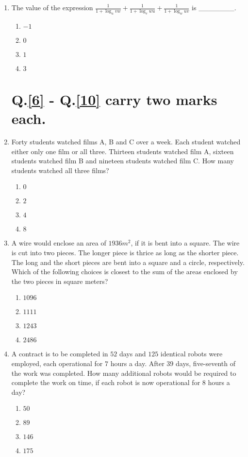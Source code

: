 \documentclass[journal]{IEEEtran}
\begin{document}
\begin{enumerate}
    \item \label{5} The value of the expression $\frac{1}{1 + \log_u vw} + \frac{1}{1 + \log_v wu} + \frac{1}{1 + \log_w uv}$ is \_\_\_\_\_\_\_.
        \begin{enumerate}
            \item $-1$
            \item $0$
            \item $1$
            \item $3$
        \end{enumerate}

\section*{Q.\ref{6} - Q.\ref{10} carry two marks each.}
    \item \label{6} Forty students watched films A, B and C over a week. Each student watched either only one film or all three. Thirteen students watched film A, sixteen students watched film B and nineteen students watched film C. How many students watched all three films?
        \begin{enumerate}
            \item $0$
            \item $2$
            \item $4$
            \item $8$
        \end{enumerate}

    \item A wire would enclose an area of $1936 m^2$, if it is bent into a square. The wire is cut into two pieces. The longer piece is thrice as long as the shorter piece. The long and the short pieces are bent into a square and a circle, respectively. Which of the following choices is closest to the sum of the areas enclosed by the two pieces in square meters?
        \begin{enumerate}
            \item $1096$
            \item $1111$
            \item $1243$
            \item $2486$
        \end{enumerate}
    
    \item A contract is to be completed in $52$ days and $125$ identical robots were employed, each operational for $7$ hours a day. After $39$ days, five-seventh of the work was completed. How many additional robots would be required to complete the work on time, if each robot is now operational for 8 hours a day?
        \begin{enumerate}
            \item $50$
            \item $89$
            \item $146$
            \item $175$
        \end{enumerate}


\end{enumerate}
\end{document}
